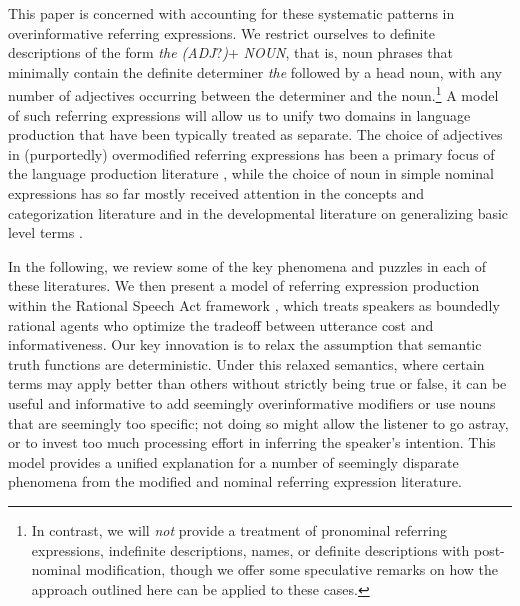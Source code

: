 \documentclass[11pt]{article}
\newcommand{\cg}[1]{\textcolor{Purple}{[cg: #1]}}
\begin{document}
This paper is concerned with accounting for these systematic patterns in overinformative referring expressions. We restrict ourselves to definite descriptions of the form \emph{the (ADJ}?\emph{)}+ \emph{NOUN}, that is, noun phrases that minimally contain the definite determiner \emph{the} followed by a head noun, with any number of adjectives occurring between the determiner and the noun.\footnote{In contrast, we will \emph{not} provide a treatment of pronominal referring expressions, indefinite descriptions, names, or definite descriptions with post-nominal modification, though we offer some speculative remarks on how the approach outlined here can be applied to these cases.} 
A model of such referring expressions will allow us to unify two domains in language production that have been typically treated as separate. %
The choice of adjectives in (purportedly) overmodified referring expressions has been a primary focus of the language production literature
\cite{herrmann1976, Pechmann1989, nadig2002, sedivy2003a, Maes2004, Engelhardt2006, Arts2011, Koolen2011, rubiofernandez2016}, while the choice of noun in simple nominal expressions has so far mostly received attention in the concepts and categorization literature \cite{Rosch1973, Rosch1976} and in the developmental literature on generalizing basic level terms \cite{Xu2007}. %

In the following, we review some of the key phenomena and puzzles in each of these literatures. We then present a model of referring expression production within the Rational Speech Act framework \cite{frank2012, goodman2016, FrankeJaeger2016}, which treats speakers as boundedly rational agents who optimize the tradeoff between utterance cost and informativeness. Our key innovation is to relax the assumption that semantic truth functions are deterministic. Under this relaxed semantics, where certain terms may apply better than others without strictly being true or false, it can be useful and informative to add seemingly overinformative modifiers or use nouns that are seemingly too specific; not doing so might allow the listener to go astray, or to invest too much processing effort in inferring the speaker's  intention. This model provides a unified explanation for a number of seemingly disparate phenomena from the modified and nominal referring expression literature. 
\end{document}
